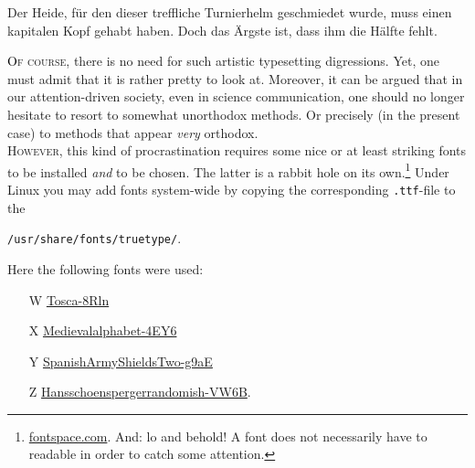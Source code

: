 \epigraph{Der Heide, für den dieser treffliche Turnierhelm geschmiedet wurde, muss einen kapitalen Kopf gehabt haben. Doch das Ärgste ist, dass ihm die Hälfte fehlt.}{}

\lettrine[lines=3, loversize=0.1]{\textcolor{black}{\Examplefontii O}}{f course}, there is no need for such artistic typesetting digressions. Yet, one must admit that it is rather pretty to look at. Moreover, it can be argued that in our attention-driven society, even in science communication, one should no longer hesitate to resort to somewhat unorthodox methods. Or precisely (in the present case) to methods that appear \emph{very} orthodox.
\\

\lettrine[lines=3, loversize=0.1]{\textcolor{\colorforcurvesi}{\Examplefonti H}}{owever}, this kind of procrastination requires some nice or at least striking fonts to be installed \emph{and} to be chosen. The latter is a rabbit hole on its own.\footnote{\Eg \href{https://www.fontspace.com/}{fontspace.com}. And: lo and behold! A font does not necessarily have to readable in order to catch some attention.
\vspace{5mm}

\scalebox{1.5}{\LARGE \Examplefontiii A B C E F }
\vspace{2mm}

\scalebox{1.5}{\LARGE \Examplefontiii G H I J K}
\vspace{2mm}

\scalebox{1.5}{\LARGE \Examplefontiii L M N O P}

} Under Linux you may add fonts system-wide by copying the corresponding \verb|.ttf|-file to the 

{\centering \verb|/usr/share/fonts/truetype/|.\par}

Here the following fonts were used:
\begin{itemize}
	\item[\Large \Examplefontiii W] \href{https://www.fontspace.com/tosca-font-f10033}{Tosca-8Rln}
	\item[\Large \Examplefontiii X] \href{https://www.fontspace.com/medievalalphabet-font-f13634}{Medievalalphabet-4EY6}
	\item[\Large \Examplefontiii Y] \href{https://www.fontspace.com/spanish-army-shields-two-font-f16698}{SpanishArmyShieldsTwo-g9aE}
	\item[\Large \Examplefontiii Z] \href{https://www.fontspace.com/hansschoenspergerrandomish-font-f8903}{Hansschoenspergerrandomish-VW6B}.
\end{itemize}

